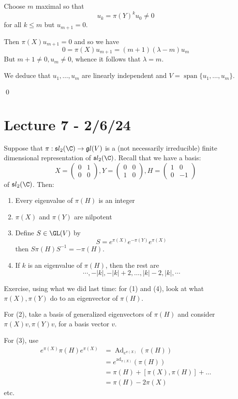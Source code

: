 \documentclass[x11names,reqno,14pt]{extarticle}
\newcommand{\pmat}[4]{\begin{pmatrix} #1 & #2 \\ #3 & #4 \end{pmatrix}}
\newcommand{\mk}[1]{\mathfrak{#1}}
\newcommand{\g}{\mk{g}}
\DeclareMathOperator{\Ad}{Ad}
\DeclareMathOperator{\ad}{ad}
\begin{document}
Choose $m$ maximal so that 
\[
u_k = \pi(Y)^ku_0 \neq0
\]
for all $k\leq m$ but $u_{m+1} = 0$.

Then $\pi(X)u_{m+1}=0$ and so we have
\[
0 = \pi(X)u_{m+1} = (m + 1)(\lambda-m)u_m
\]
But $m + 1 \neq 0, u_m \neq 0$, whence it follows that $\lambda = m$. 

We deduce that $u_1, \dots, u_m$ are linearly independent and $V = \operatorname{span}\{u_1, \dots, u_m \}$.

\qed

\section*{Lecture 7 - 2/6/24}

\thm 

Suppose that $\pi:\mk{s}l_2(\C)\to \g l(V)$ is a (not necessarily irreducible) finite dimensional representation of $\mk{s} l_2(\C)$. Recall that we have a basis: 
\[
X = \pmat{0}{1}{0}{0}, Y = \pmat{0}{0}{1}{0}, H = \pmat{1}{0}{0}{-1}
\]
of $\mk{s}l_2(\C)$. Then:

\begin{enumerate}

\item Every eigenvalue of $\pi(H)$ is an integer

\item $\pi(X)$ and $\pi(Y)$ are nilpotent

\item Define $S \in \GL(V)$ by 
\[
S = e^{\pi(X)}e^{-\pi(Y)}e^{\pi(X)}
\]
then $S\pi(H)S^{-1} = -\pi(H)$. 

\item If $k$ is an eigenvalue of $\pi(H)$, then the rest are
\[
\cdots, -|k|, -|k| + 2, \dots, |k| - 2, |k|, \cdots
\]

\end{enumerate}

\proof

Exercise, using what we did last time: for (1) and (4), look at what $\pi(X),\pi(Y)$ do to an eigenvector of $\pi(H)$.

For (2), take a basis of generalized eigenvectors of $\pi(H)$ and consider $\pi(X)v,\pi(Y)v$, for a basis vector $v$. 

For (3), use
\begin{align*}
e^{\pi(X)}\pi(H)e^{\pi(X)} & = \Ad_{e^{\pi(X)}}(\pi(H)) \\
									 & = e^{\ad_{\pi(X)}}(\pi(H)) \\
									 & = \pi(H) + [\pi(X),\pi(H)] + \dots \\
								    & = \pi(H) - 2\pi(X)
\end{align*}
etc. 
\end{document}
